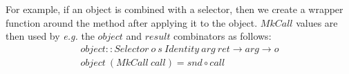 For example, if an object is combined with a selector, then we create a wrapper function around the method after applying it to the object. $\mathit{MkCall}$ values are then used by \emph{e.g.} the $\mathit{object}$ and $\mathit{result}$ combinators as follows:
\begin{displaymath}
\begin{array}{l}
\mathit{object} :: \mathit{Selector}~o~s~\mathit{Identity}~\mathit{arg}~\mathit{ret} \to arg \to o\\
\mathit{object}~(\mathit{MkCall}~\mathit{call})  = \mathit{snd} \circ \mathit{call}
\end{array}
\end{displaymath}

